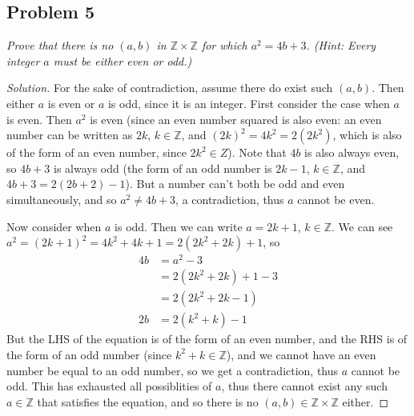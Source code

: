 \documentclass{article}
\newcommand{\Z}{{\mathbb Z}}
\begin{document}
\subsection*{Problem 5}
{\it Prove that there is no $(a,b)$ in $\Z \times \Z$ for which $a^2 = 4b + 3$.
(Hint: Every integer $a$ must be either even or odd.)}
\begin{proof}[Solution]
For the sake of contradiction, assume there do exist such $(a,b)$.
Then either $a$ is even or $a$ is odd, since it is an integer.
First consider the case when $a$ is even.
Then $a^2$ is even (since an even number squared is also even:
an even number can be written as $2k$, $k \in \Z$,
and $(2k)^2 = 4k^2 = 2(2k^2)$,
which is also of the form of an even number,
since $2k^2 \in Z$).
Note that $4b$ is also always even,
so $4b + 3$ is always odd (the form of an odd number is $2k-1$,
$k \in \Z$, and $4b + 3 = 2(2b+2) - 1$).
But a number can't both be odd and even simultaneously,
and so $a^2 \neq 4b + 3$, a contradiction,
thus $a$ cannot be even.

Now consider when $a$ is odd.
Then we can write $a = 2k+1$, $k \in \Z$.
We can see $a^2 = (2k+1)^2 = 4k^2+4k+1 = 2(2k^2+2k) + 1$, so
\begin{align*}
	4b &= a^2 - 3\\
	&= 2(2k^2+2k) + 1 - 3\\
	&= 2(2k^2 + 2k - 1)\\
	2b &= 2(k^2 + k) - 1
\end{align*}
But the LHS of the equation is of the form of an even number,
and the RHS is of the form of an odd number (since $k^2+k\in\Z$),
and we cannot have an even number be equal to an odd number,
so we get a contradiction, thus $a$ cannot be odd.
This has exhausted all possiblities of $a$,
thus there cannot exist any such $a \in \Z$ that satisfies the equation,
and so there is no $(a,b) \in \Z \times \Z$ either.
\end{proof}
\clearpage
\end{document}
